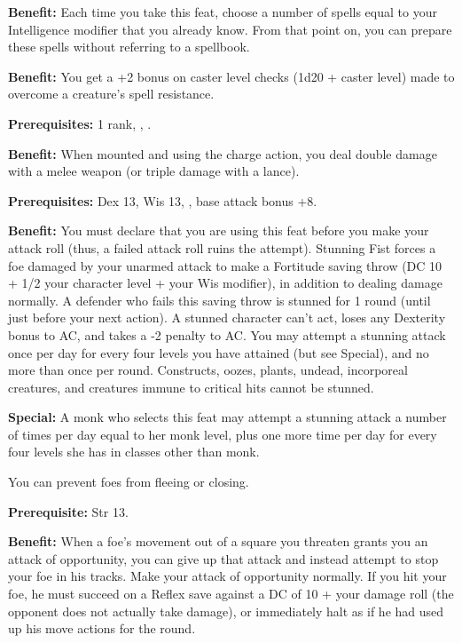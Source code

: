 \textbf{Benefit:} Each time you take this feat, choose a number of spells equal to your Intelligence modifier that you already know. From that point on, you can prepare these spells without referring to a spellbook.


\textbf{Benefit:} You get a +2 bonus on caster level checks (1d20 + caster level) made to overcome a creature's spell resistance.


\textbf{Prerequisites:}  1 rank, , .

\textbf{Benefit:} When mounted and using the charge action, you deal double damage with a melee weapon (or triple damage with a lance).


\textbf{Prerequisites:} Dex 13, Wis 13, , base attack bonus 
+8.

\textbf{Benefit:} You must declare that you are using this feat before you make your attack roll (thus, a failed attack roll ruins the attempt). Stunning Fist forces a foe damaged by your unarmed attack to make a Fortitude saving throw (DC 10 + 1/2 your character level + your Wis modifier), in addition to dealing damage normally. A defender who fails this saving throw is stunned for 1 round (until just before your next action). A stunned character can't act, loses any Dexterity bonus to AC, and takes a -2 penalty to AC. You may attempt a stunning attack once per day for every four levels you have attained (but see Special), and no more than once per round. Constructs, oozes, plants, undead, incorporeal creatures, and creatures immune to critical hits cannot be stunned.

\textbf{Special:} A monk who selects this feat may attempt a stunning attack a number of times per day equal to her monk level, plus one more time per day for every four levels she has in classes other than monk.


You can prevent foes from fleeing or closing.

\textbf{Prerequisite:} Str 13.

\textbf{Benefit:} When a foe's movement out of a square you threaten grants you an attack of opportunity, you can give up that attack and instead attempt to stop your foe in his tracks. Make your attack of opportunity normally. If you hit your foe, he must succeed on a Reflex save against a DC of 10 + your damage roll (the opponent does not actually take damage), or immediately halt as if he had used up his move actions for the round.

